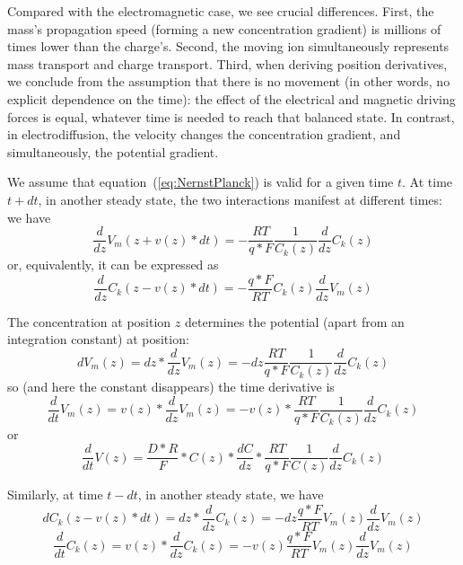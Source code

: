 Compared with the electromagnetic case, we see crucial differences.
First, the mass's propagation speed (forming a new concentration gradient) is millions of times lower than
the charge's. Second, the moving ion simultaneously represents
mass transport and charge transport.
Third, when deriving position derivatives, we conclude from the assumption that
there is no movement (in other words, no explicit dependence on the
time): the effect of the electrical and magnetic driving forces is
equal, whatever time is needed to reach that balanced state. In contrast, in 
electrodiffusion, the velocity changes the concentration gradient, and simultaneously, the
potential gradient. 


{
We assume that equation~(\ref{eq:NernstPlanck}) is valid for a given time
$t$.
At time $t+dt$, in another steady state, the two interactions
manifest at different times: we have
%
\begin{equation}
\frac{d}{dz}V_{m}(z+v(z)*dt)=-\frac{RT}{q*F}\frac{1}{C_{k}(z)}\frac{d}{dz}C_{k}(z)\label{eq:Nernst-1V}
\end{equation}
%
\noindent or, equivalently, it can be expressed as
%
\begin{equation}
\frac{d}{dz}C_{k}(z-v(z)*dt)=-\frac{q*F}{RT}C_{k}(z)\frac{d}{dz}V_{m}(z)\label{eq:Nernst-1C}
\end{equation}

\noindent The concentration at position $z$ determines the potential
(apart from an integration constant) at position:
%
\begin{equation}
dV_{m}(z)=dz*\frac{d}{dz}V_{m}(z)=-dz\frac{RT}{q*F}\frac{1}{C_{k}(z)}\frac{d}{dz}C_{k}(z)\label{eq:Nernst-2V}
\end{equation}
so (and here the constant disappears) the time derivative is
%
\begin{equation}
\frac{d}{dt}V_{m}(z)=v(z)*\frac{d}{dz}V_{m}(z)=-v(z)*\frac{RT}{q*F}\frac{1}{C_{k}(z)}\frac{d}{dz}C_{k}(z)\label{eq:Nernst-dVdt}
\end{equation}
or
\begin{equation}
\frac{d}{dt}V(z)=\frac{D*R}{F}*C(z)*\frac{dC}{dz}*\frac{RT}{q*F}\frac{1}{C(z)}\frac{d}{dz}C_{k}(z)\label{eq:Nernst-dVdt2}
\end{equation}

\noindent Similarly, at time $t-dt$, in another steady state, we
have
%
\begin{equation}
dC_{k}(z-v(z)*dt)=dz*\frac{d}{dz}C_{k}(z)=-dz\frac{q*F}{RT}V_{m}(z)\frac{d}{dz}V_{m}(z)\label{eq:Nernst-2C}
\end{equation}
\begin{equation}
\frac{d}{dt}C_{k}(z)=v(z)*\frac{d}{dz}C_{k}(z)=-v(z)\frac{q*F}{RT}V_{m}(z)\frac{d}{dz}V_{m}(z)\label{eq:Nernst-dCdt}
\end{equation}
}

